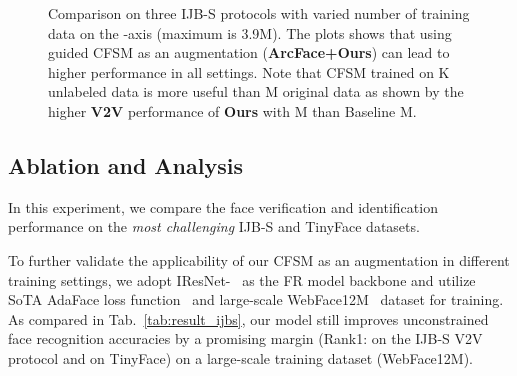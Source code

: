 \begin{figure}[t]
\footnotesize
\vspace{0mm}
\caption{ Comparison on three IJB-S protocols 
with varied number of training data on the -axis (maximum is 3.9M). The plots shows that using guided CFSM as an augmentation (\textcolor{mygreen}{\textbf{ArcFace+Ours}}) can lead to higher performance in all settings. Note that CFSM trained on K unlabeled data is more useful than M original data as shown by the higher \textbf{V2V} performance of \textbf{Ours} with M than Baseline M. } 
\label{fig:diff_training}
\vspace{-2mm}
\end{figure}







\subsection{Ablation and Analysis}
In this experiment, we compare the face verification and identification performance on the \emph{most challenging} IJB-S and TinyFace datasets.  

 To further validate the applicability of our CFSM as an augmentation in different training settings, we adopt IResNet-~\cite{deng2019arcface} as the FR model backbone and utilize SoTA AdaFace loss function~\cite{kim2022adaface} and large-scale WebFace12M~\cite{zhu2021webface260m} dataset for training. As compared in Tab.~\ref{tab:result_ijbs}, our model still improves unconstrained face recognition accuracies by a promising margin (Rank1:  on the IJB-S V2V protocol and  on TinyFace) on a large-scale training dataset (WebFace12M).


